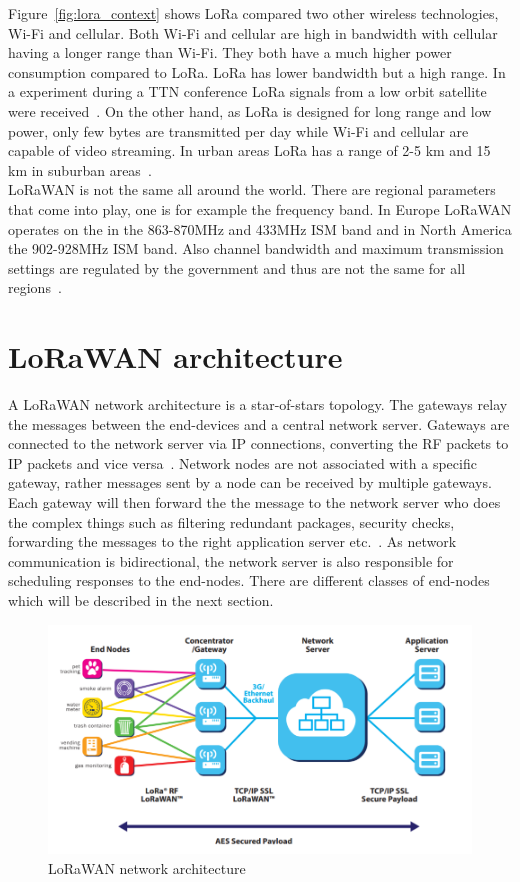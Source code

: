 Figure~\ref{fig:lora_context} shows LoRa compared two other wireless technologies, Wi-Fi and cellular. Both Wi-Fi and cellular
are high in bandwidth with cellular having a longer range than Wi-Fi. They both have a much higher power consumption compared to LoRa.
LoRa has lower bandwidth but a high range. In a experiment during a TTN conference LoRa signals from a low orbit satellite were received~\cite{loa_satellite}.
On the other hand, as LoRa is designed for long range and low power, only few bytes are transmitted per day while Wi-Fi and cellular are capable of video streaming.
In urban areas LoRa has a range of 2-5 km and 15 km in suburban areas~\cite{limits_lora}.\\
LoRaWAN is not the same all around the world. There are regional parameters that come into play, one is for example the frequency band.
In Europe LoRaWAN operates on the in the 863-870MHz and 433MHz ISM band and in North America the 902-928MHz ISM band. Also channel bandwidth and maximum transmission 
settings are regulated by the government and thus are not the same for all regions~\cite{lora_wan_regional}.


\section{LoRaWAN architecture}
A LoRaWAN network architecture is a star-of-stars topology. The gateways relay the messages between the end-devices and a central network server.
Gateways are connected to the network server via IP connections, converting the RF packets to IP packets and vice versa~\cite{about_lora_wan}.
Network nodes are not associated with a specific gateway, rather messages sent by a node can be received by multiple gateways. Each gateway will then 
forward the the message to the network server who does the complex things such as filtering redundant packages, security checks, forwarding the messages
to the right application server etc.~\cite{what_is_lora_wan}.
As network communication is bidirectional, the network server is also responsible for scheduling responses to the end-nodes. There are different classes of 
end-nodes which will be described in the next section.

\begin{figure}[h]
    \centering
    \includegraphics[width=1\textwidth]{figures/lorawan_network.png}
    \caption{LoRaWAN network architecture~\cite{what_is_lora_wan}}
    \label{fig:lorawan_network}
\end{figure}

